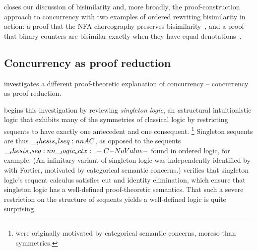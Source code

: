  closes our discussion of bisimilarity and, more broadly, the proof-construction approach to concurrency with two examples of ordered rewriting bisimilarity in action: a proof that the \acs*{NFA} choreography preserves bisimilarity~, and a proof that binary counters are bisimilar exactly when they have equal denotations~.






\clearpage
\subsection{Concurrency as proof reduction}

 investigates a different proof-theoretic explanation of concurrency -- concurrency as proof reduction.

 begins this investigation by reviewing \emph{singleton logic}\autocites{Santocanale:FOSSACS02}{Fortier+Santocanale:CSL13}, an \emph{a}struc\-tural intuitionistic logic that exhibits many of the symmetries of classical logic by restricting sequents to have exactly one antecedent and one consequent.%
\footnote{ were originally motivated by categorical semantic concerns, moreso than symmetries.}
Singleton sequents are thus $\slseq{A |- C}$, as opposed to the sequents $\oseq{\octx |- C}$ found in ordered logic, for example.
(An infinitary variant of singleton logic was independently identified by \citeauthor{Santocanale:FOSSACS02} with Fortier\autocites{Santocanale:FOSSACS02}{Fortier+Santocanale:CSL13}, motivated by categorical semantic concerns.)
 verifies that singleton logic's sequent calculus satisfies cut and identity elimination, which ensure that singleton logic has a well-defined proof-theoretic semantics.%
That such a severe restriction on the structure of sequents yields a well-defined logic is quite surprising.

